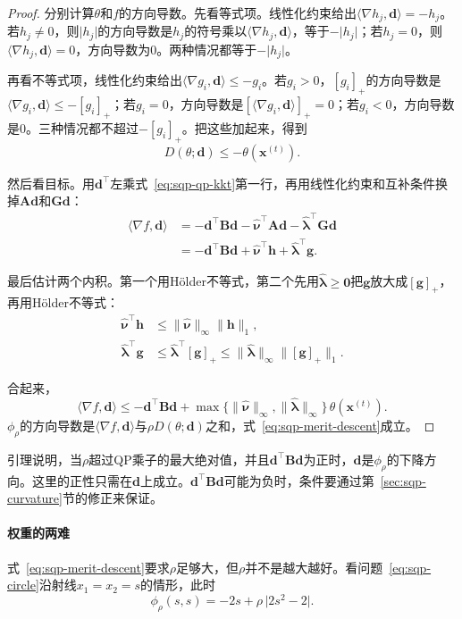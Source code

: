 \begin{proof}
分别计算$\theta$和$f$的方向导数。先看等式项。线性化约束给出$\langle\nabla h_j,\bm{d}\rangle=-h_j$。若$h_j\neq0$，则$\lvert h_j\rvert$的方向导数是$h_j$的符号乘以$\langle\nabla h_j,\bm{d}\rangle$，等于$-\lvert h_j\rvert$；若$h_j=0$，则$\langle\nabla h_j,\bm{d}\rangle=0$，方向导数为$0$。两种情况都等于$-\lvert h_j\rvert$。

再看不等式项，线性化约束给出$\langle\nabla g_i,\bm{d}\rangle\leq-g_i$。若$g_i>0$，$[g_i]_+$的方向导数是$\langle\nabla g_i,\bm{d}\rangle\leq-[g_i]_+$；若$g_i=0$，方向导数是$[\langle\nabla g_i,\bm{d}\rangle]_+=0$；若$g_i<0$，方向导数是$0$。三种情况都不超过$-[g_i]_+$。把这些加起来，得到
\[
 D(\theta;\bm{d})\leq-\theta(\bm{x}^{(t)}).
\]

然后看目标。用$\bm{d}^\top$左乘式~\eqref{eq:sqp-qp-kkt}第一行，再用线性化约束和互补条件换掉$\bm{A}\bm{d}$和$\bm{G}\bm{d}$：
\[
 \begin{aligned}
 \langle\nabla f,\bm{d}\rangle
 &=-\bm{d}^\top\bm{B}\bm{d}-\hat{\bm{\nu}}^\top\bm{A}\bm{d}-\hat{\bm{\lambda}}^\top\bm{G}\bm{d}\\
 &=-\bm{d}^\top\bm{B}\bm{d}+\hat{\bm{\nu}}^\top\bm{h}+\hat{\bm{\lambda}}^\top\bm{g}.
 \end{aligned}
\]

最后估计两个内积。第一个用Hölder不等式，第二个先用$\hat{\bm{\lambda}}\geq\bm{0}$把$\bm{g}$放大成$[\bm{g}]_+$，再用Hölder不等式：
\[
 \begin{aligned}
 \hat{\bm{\nu}}^\top\bm{h}&\leq\lVert\hat{\bm{\nu}}\rVert_\infty\lVert\bm{h}\rVert_1,\\
 \hat{\bm{\lambda}}^\top\bm{g}&\leq\hat{\bm{\lambda}}^\top[\bm{g}]_+\leq\lVert\hat{\bm{\lambda}}\rVert_\infty\lVert[\bm{g}]_+\rVert_1.
 \end{aligned}
\]

合起来，
\[
 \langle\nabla f,\bm{d}\rangle\leq-\bm{d}^\top\bm{B}\bm{d}+\max\{\lVert\hat{\bm{\nu}}\rVert_\infty,\lVert\hat{\bm{\lambda}}\rVert_\infty\}\,\theta(\bm{x}^{(t)}).
\]
$\phi_\rho$的方向导数是$\langle\nabla f,\bm{d}\rangle$与$\rho D(\theta;\bm{d})$之和，式~\eqref{eq:sqp-merit-descent}成立。
\end{proof}

引理说明，当$\rho$超过QP乘子的最大绝对值，并且$\bm{d}^\top\bm{B}\bm{d}$为正时，$\bm{d}$是$\phi_\rho$的下降方向。这里的正性只需在$\bm{d}$上成立。$\bm{d}^\top\bm{B}\bm{d}$可能为负时，条件要通过第~\ref{sec:sqp-curvature}节的修正来保证。

\paragraph{权重的两难}
式~\eqref{eq:sqp-merit-descent}要求$\rho$足够大，但$\rho$并不是越大越好。看问题~\eqref{eq:sqp-circle}沿射线$x_1=x_2=s$的情形，此时
\[
 \phi_\rho(s,s)=-2s+\rho\,\lvert2s^2-2\rvert.
\]

